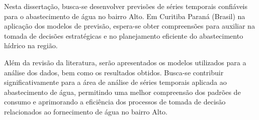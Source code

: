 Nesta dissertação, busca-se desenvolver previsões de séries temporais confiáveis para o abastecimento de água no bairro Alto. Em Curitiba Paraná (Brasil) na aplicação dos modelos de previsão, espera-se obter compreensões para auxiliar na tomada de decisões estratégicas e no planejamento eficiente do abastecimento hídrico na região.

Além da revisão da literatura, serão apresentados os modelos utilizados para a análise dos dados, bem como os resultados obtidos. Busca-se contribuir significativamente para a área de análise de séries temporais aplicada ao abastecimento de água, permitindo uma melhor compreensão dos padrões de consumo e aprimorando a eficiência dos processos de tomada de decisão relacionados ao fornecimento de água no bairro Alto.


          

   

    

    

    